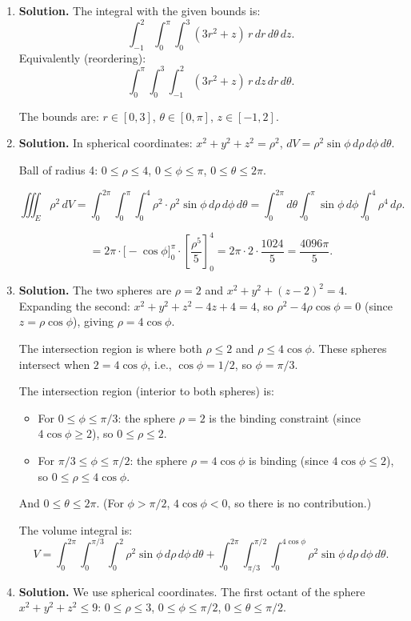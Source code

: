 \begin{enumerate}
\item \textbf{Solution.}
The integral with the given bounds is:
\[
\boxed{\int_{-1}^{2}\int_0^{\pi}\int_0^3 (3r^2+z)\,r\,dr\,d\theta\,dz}.
\]
Equivalently (reordering):
\[
\int_0^{\pi}\int_0^3\int_{-1}^{2}(3r^2+z)\,r\,dz\,dr\,d\theta.
\]

The bounds are: $r\in[0,3]$, $\theta\in[0,\pi]$, $z\in[-1,2]$.

\item \textbf{Solution.}
In spherical coordinates: $x^2+y^2+z^2 = \rho^2$, $dV = \rho^2\sin\phi\,d\rho\,d\phi\,d\theta$.

Ball of radius 4: $0\le\rho\le 4$, $0\le\phi\le\pi$, $0\le\theta\le 2\pi$.

\[
\iiint_E\rho^2\,dV = \int_0^{2\pi}\int_0^{\pi}\int_0^4\rho^2\cdot\rho^2\sin\phi\,d\rho\,d\phi\,d\theta = \int_0^{2\pi}d\theta\int_0^{\pi}\sin\phi\,d\phi\int_0^4\rho^4\,d\rho.
\]

\[
= 2\pi\cdot\bigl[-\cos\phi\bigr]_0^\pi\cdot\left[\frac{\rho^5}{5}\right]_0^4 = 2\pi\cdot 2\cdot\frac{1024}{5} = \boxed{\frac{4096\pi}{5}}.
\]

\item \textbf{Solution.}
The two spheres are $\rho = 2$ and $x^2+y^2+(z-2)^2=4$. Expanding the second: $x^2+y^2+z^2-4z+4=4$, so $\rho^2-4\rho\cos\phi=0$ (since $z=\rho\cos\phi$), giving $\rho = 4\cos\phi$.

The intersection region is where both $\rho\le 2$ and $\rho\le 4\cos\phi$. These spheres intersect when $2 = 4\cos\phi$, i.e., $\cos\phi = 1/2$, so $\phi = \pi/3$.

The intersection region (interior to both spheres) is:
\begin{itemize}
\item For $0\le\phi\le\pi/3$: the sphere $\rho=2$ is the binding constraint (since $4\cos\phi\ge 2$), so $0\le\rho\le 2$.
\item For $\pi/3\le\phi\le\pi/2$: the sphere $\rho=4\cos\phi$ is binding (since $4\cos\phi\le 2$), so $0\le\rho\le 4\cos\phi$.
\end{itemize}
And $0\le\theta\le 2\pi$. (For $\phi>\pi/2$, $4\cos\phi<0$, so there is no contribution.)

The volume integral is:
\[
\boxed{V = \int_0^{2\pi}\int_0^{\pi/3}\int_0^{2}\rho^2\sin\phi\,d\rho\,d\phi\,d\theta + \int_0^{2\pi}\int_{\pi/3}^{\pi/2}\int_0^{4\cos\phi}\rho^2\sin\phi\,d\rho\,d\phi\,d\theta}.
\]

\item \textbf{Solution.}
We use spherical coordinates. The first octant of the sphere $x^2+y^2+z^2\le 9$: $0\le\rho\le 3$, $0\le\phi\le\pi/2$, $0\le\theta\le\pi/2$.


\end{enumerate}
